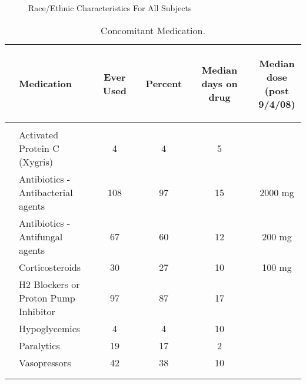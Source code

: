 \documentclass[dvips,10pt]{article}
\begin{document}
\begin{figure}
\caption{Race/Ethnic Characteristics For All Subjects}
\end{figure}
\clearpage
\begin{table}[t]
\caption
{ Concomitant Medication. }
\begin{center}
\begin{tabular}{ @{}l@{}
@{}l@{}@{}p{1.5em}@{}@{}c@{}@{}p{1.5em}@{}@{}c@{}@{}p{1.5em}@{}@{}c@{}@{}p{1.5em}@{}@{}c@{}
}
\hline

& \parbox{6em}{\begin{center}Medication\end{center}} && \parbox{6em}{\begin{center}Ever Used\end{center}} && \parbox{6em}{\begin{center}Percent\end{center}} && \parbox{6em}{\begin{center}Median days on drug\end{center}} && \parbox{6em}{\begin{center}Median dose (post 9/4/08)\end{center}} \\

\hline

\\
& Activated Protein C (Xygris) && 4 && 4 && 5 &&  \\
& Antibiotics - Antibacterial agents && 108 && 97 && 15 && 2000 mg \\
& Antibiotics - Antifungal agents && 67 && 60 && 12 && 200 mg \\
& Corticosteroids && 30 && 27 && 10 && 100 mg \\
& H2 Blockers or Proton Pump Inhibitor && 97 && 87 && 17 &&  \\
& Hypoglycemics && 4 && 4 && 10 &&  \\
& Paralytics && 19 && 17 && 2 &&  \\
& 
Vasopressors && 42 && 38 && 10 &&  \\
\\
\hline \\

\end{tabular}

\end{center}
 \end{table}
\end{document}
